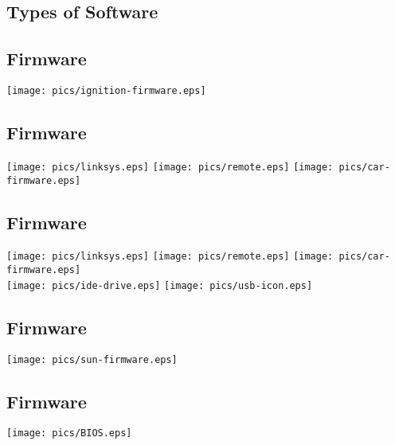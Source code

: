 \documentclass[xga]{xdvislides}
\begin{document}
\subsection{Types of Software}

\subsection{Firmware}
\begin{center}
	\texttt{[image: pics/ignition-firmware.eps]}
\end{center}

\subsection{Firmware}
\begin{center}
	\texttt{[image: pics/linksys.eps]}
	\texttt{[image: pics/remote.eps]}
	\texttt{[image: pics/car-firmware.eps]}
\end{center}

\subsection{Firmware}
\begin{center}
	\texttt{[image: pics/linksys.eps]}
	\texttt{[image: pics/remote.eps]}
	\texttt{[image: pics/car-firmware.eps]} \\
	\texttt{[image: pics/ide-drive.eps]}
	\texttt{[image: pics/usb-icon.eps]}
\end{center}



\subsection{Firmware}
\begin{center}
	\texttt{[image: pics/sun-firmware.eps]}
\end{center}

\subsection{Firmware}
\begin{center}
	\texttt{[image: pics/BIOS.eps]}
\end{center}
\end{document}
